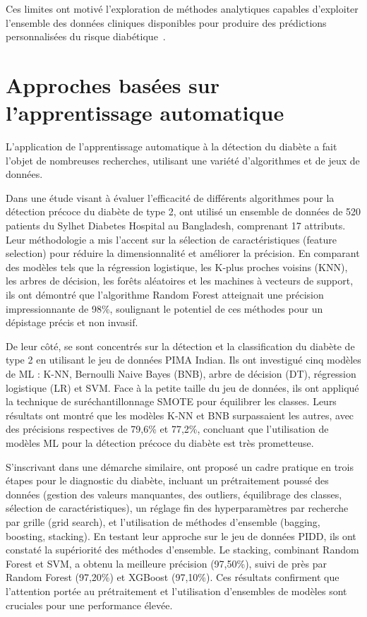 Ces limites ont motivé l'exploration de méthodes analytiques capables d'exploiter l'ensemble
des données cliniques disponibles pour produire des prédictions personnalisées du risque
diabétique~\citep{sisodia2018, kavakiotis2017}.

\section{Approches basées sur l'apprentissage automatique}

L'application de l'apprentissage automatique à la détection du diabète a fait l'objet de nombreuses recherches, utilisant une variété d'algorithmes et de jeux de données.

Dans une étude visant à évaluer l'efficacité de différents algorithmes pour la détection précoce du diabète de type 2, \cite{gowthami2024exploring} ont utilisé un ensemble de données de 520 patients du Sylhet Diabetes Hospital au Bangladesh, comprenant 17 attributs. Leur méthodologie a mis l'accent sur la sélection de caractéristiques (feature selection) pour réduire la dimensionnalité et améliorer la précision. En comparant des modèles tels que la régression logistique, les K-plus proches voisins (KNN), les arbres de décision, les forêts aléatoires et les machines à vecteurs de support, ils ont démontré que l'algorithme Random Forest atteignait une précision impressionnante de 98\%, soulignant le potentiel de ces méthodes pour un dépistage précis et non invasif.

De leur côté, \cite{iparraguirre2023application} se sont concentrés sur la détection et la classification du diabète de type 2 en utilisant le jeu de données PIMA Indian. Ils ont investigué cinq modèles de ML : K-NN, Bernoulli Naive Bayes (BNB), arbre de décision (DT), régression logistique (LR) et SVM. Face à la petite taille du jeu de données, ils ont appliqué la technique de suréchantillonnage SMOTE pour équilibrer les classes. Leurs résultats ont montré que les modèles K-NN et BNB surpassaient les autres, avec des précisions respectives de 79,6\% et 77,2\%, concluant que l'utilisation de modèles ML pour la détection précoce du diabète est très prometteuse.

S'inscrivant dans une démarche similaire, \cite{saihood2023practical} ont proposé un cadre pratique en trois étapes pour le diagnostic du diabète, incluant un prétraitement poussé des données (gestion des valeurs manquantes, des outliers, équilibrage des classes, sélection de caractéristiques), un réglage fin des hyperparamètres par recherche par grille (grid search), et l'utilisation de méthodes d'ensemble (bagging, boosting, stacking). En testant leur approche sur le jeu de données PIDD, ils ont constaté la supériorité des méthodes d'ensemble. Le stacking, combinant Random Forest et SVM, a obtenu la meilleure précision (97,50\%), suivi de près par Random Forest (97,20\%) et XGBoost (97,10\%). Ces résultats confirment que l'attention portée au prétraitement et l'utilisation d'ensembles de modèles sont cruciales pour une performance élevée.

